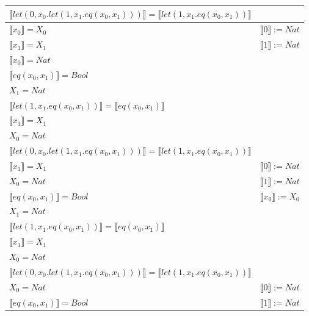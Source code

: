 \begin{exercise}
\begin{description}
\begin{center}
\begin{longtable}{ | l | l | }
                        $ \llbracket let(0,x_0.let(1,x_1.eq(x_0,x_1))) \rrbracket =  \llbracket let(1,x_1.eq(x_0,x_1)) \rrbracket$ & \\
                      \hline
                        $ \llbracket x_0 \rrbracket = X_0$ &  $ \llbracket 0 \rrbracket := Nat$  \\
                        $ \llbracket x_1 \rrbracket = X_1$  &  $ \llbracket 1 \rrbracket := Nat$\\
                        $ \llbracket x_0 \rrbracket = Nat$  & \\
                        $ \llbracket eq(x_0,x_1) \rrbracket = Bool$  & \\
                        $X_1 = Nat$ & \\
                        $ \llbracket let(1,x_1.eq(x_0,x_1)) \rrbracket =  \llbracket eq(x_0,x_1) \rrbracket$  & \\
                        $ \llbracket x_1 \rrbracket = X_1$  & \\
                        $X_0 = Nat$ & \\
                        $ \llbracket let(0,x_0.let(1,x_1.eq(x_0,x_1))) \rrbracket =  \llbracket let(1,x_1.eq(x_0,x_1)) \rrbracket$ & \\
                      \hline
                        $ \llbracket x_1 \rrbracket = X_1$  &   $ \llbracket 0 \rrbracket := Nat$\\
                        $X_0 = Nat$  & $ \llbracket 1 \rrbracket := Nat$ \\
                        $ \llbracket eq(x_0,x_1) \rrbracket = Bool$  &  $ \llbracket x_0 \rrbracket := X_0$ \\
                        $X_1 = Nat$ & \\
                        $ \llbracket let(1,x_1.eq(x_0,x_1)) \rrbracket =  \llbracket eq(x_0,x_1) \rrbracket$  & \\
                        $ \llbracket x_1 \rrbracket = X_1$  & \\
                        $X_0 = Nat$ & \\
                        $ \llbracket let(0,x_0.let(1,x_1.eq(x_0,x_1))) \rrbracket =  \llbracket let(1,x_1.eq(x_0,x_1)) \rrbracket$ & \\
                      \hline
                        $X_0 = Nat$  & $ \llbracket 0 \rrbracket := Nat$ \\
                        $ \llbracket eq(x_0,x_1) \rrbracket = Bool$  &  $ \llbracket 1 \rrbracket := Nat$ \\

\end{longtable}
\end{center}
\end{description}
\end{exercise}
